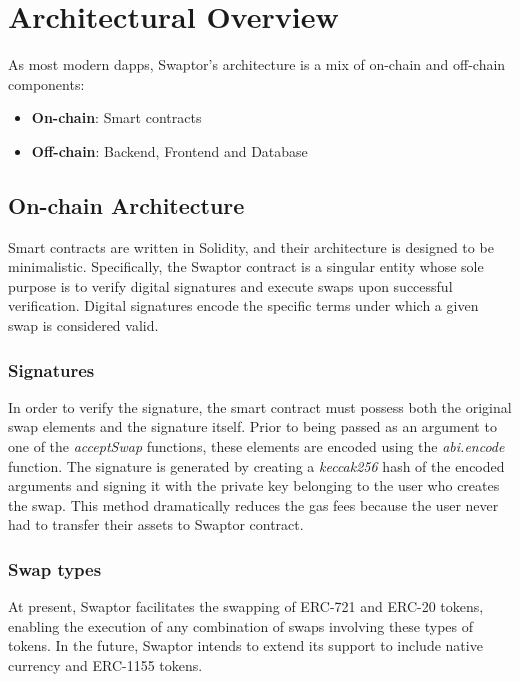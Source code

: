 \documentclass[12pt]{article}
\begin{document}
\section{Architectural Overview} \label{form}
\indent As most modern dapps, Swaptor's architecture is a mix of on-chain and off-chain components:
\begin{itemize}
  \item \textbf{On-chain}: Smart contracts
  \item \textbf{Off-chain}: Backend, Frontend and Database
\end{itemize}

\subsection{On-chain Architecture}

\indent Smart contracts are written in Solidity, and their architecture is designed to be minimalistic.
Specifically, the Swaptor contract is a singular entity whose sole purpose is to verify digital signatures
and execute swaps upon successful verification. Digital signatures encode the specific terms under which a given swap is considered valid.

\subsubsection{Signatures}

In order to verify the signature, the smart contract must possess both the original swap elements
and the signature itself. Prior to being passed as an argument to one of the \textit{acceptSwap} functions,
these elements are encoded using the \textit{abi.encode} function. The signature is generated by creating a
\textit{keccak256} hash of the encoded arguments and signing it with the private key belonging to the user who creates the swap.
This method dramatically reduces the gas fees because the user never had to transfer their assets to Swaptor contract.

\subsubsection{Swap types}

At present, Swaptor facilitates the swapping of ERC-721 and ERC-20 tokens, enabling the execution of any combination of swaps involving these types of tokens.
In the future, Swaptor intends to extend its support to include native currency and ERC-1155 tokens.
\end{document}
